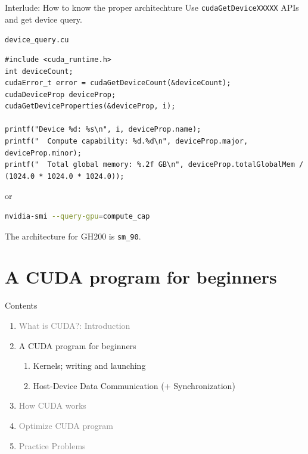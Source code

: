 \documentclass[dvipdfmx, 11pt, aspectratio=169]{beamer}   %
\begin{document}
\begin{frame}[fragile]{Interlude: How to know the proper architechture}
  Use \lstinline|cudaGetDeviceXXXXX| APIs and get device query.
  \begin{block}{\lstinline|device_query.cu|}
    \begin{lstlisting}[language=CUDA]
#include <cuda_runtime.h>
int deviceCount;
cudaError_t error = cudaGetDeviceCount(&deviceCount);
cudaDeviceProp deviceProp;
cudaGetDeviceProperties(&deviceProp, i);
      
printf("Device %d: %s\n", i, deviceProp.name);
printf("  Compute capability: %d.%d\n", deviceProp.major, deviceProp.minor);
printf("  Total global memory: %.2f GB\n", deviceProp.totalGlobalMem / (1024.0 * 1024.0 * 1024.0));
\end{lstlisting}
  \end{block}\vspace{-\baselineskip}
  or \vspace{-1.5\baselineskip}
  \begin{block}{}
    \begin{lstlisting}[language=bash]
  nvidia-smi --query-gpu=compute_cap
\end{lstlisting}
  \end{block}\vspace{-\baselineskip}
  The architecture for GH200 is \lstinline|sm_90|.
\end{frame}
\section{A CUDA program for beginners}
\begin{frame}{Contents}
  \begin{enumerate}%
    \item \textcolor{gray}{What is CUDA?: Introduction}
    \item A CUDA program for beginners
    \begin{enumerate}
      \item Kernels; writing and launching
      \item Host-Device Data Communication (+ Synchronization)
    \end{enumerate}
    \item \textcolor{gray}{How CUDA works}
    \item \textcolor{gray}{Optimize CUDA program}
    \item \textcolor{gray}{Practice Problems}
  \end{enumerate}
\end{frame}
\end{document}
